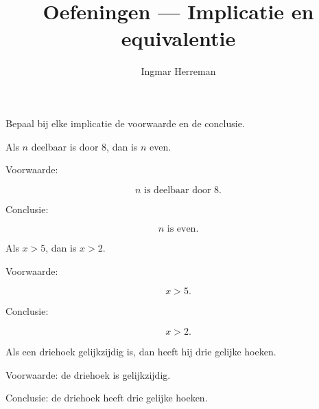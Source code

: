 \documentclass{ximera}
\title{Oefeningen — Implicatie en equivalentie}
\author{Ingmar Herreman}
\begin{document}

\maketitle

\FVDResetExercises





\begin{oefening}{\oefB\ESS}

Bepaal bij elke implicatie de voorwaarde en de conclusie.

\begin{question}

Als $n$ deelbaar is door $8$, dan is $n$ even.

\begin{oplossing}

Voorwaarde:

\[
n\text{ is deelbaar door }8.
\]

Conclusie:

\[
n\text{ is even}.
\]

\end{oplossing}

\end{question}


\begin{question}

Als $x>5$, dan is $x>2$.

\begin{oplossing}

Voorwaarde:

\[
x>5.
\]

Conclusie:

\[
x>2.
\]

\end{oplossing}

\end{question}


\begin{question}

Als een driehoek gelijkzijdig is, dan heeft hij drie gelijke hoeken.

\begin{oplossing}

Voorwaarde: de driehoek is gelijkzijdig.

Conclusie: de driehoek heeft drie gelijke hoeken.

\end{oplossing}

\end{question}

\end{oefening}
\end{document}
